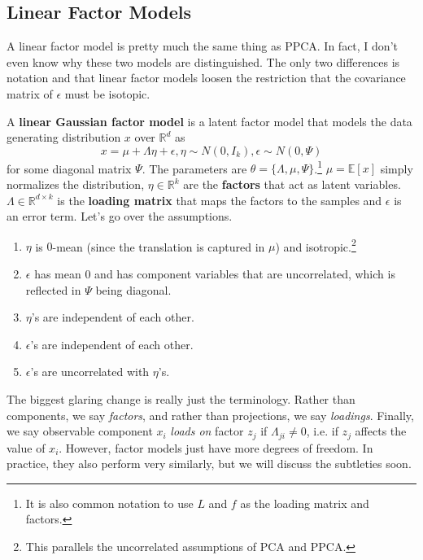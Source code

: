 \subsection{Linear Factor Models} 

  A linear factor model is pretty much the same thing as PPCA. In fact, I don't even know why these two models are distinguished. The only two differences is notation and that linear factor models loosen the restriction that the covariance matrix of $\epsilon$ must be isotopic. 

  \begin{definition} 
    A \textbf{linear Gaussian factor model} is a latent factor model that models the data generating distribution $x$ over $\mathbb{R}^d$ as 
    \begin{equation}
      x = \mu + \Lambda \eta + \epsilon, \eta \sim N(0, I_k), \epsilon \sim N(0, \Psi)
    \end{equation}
    for some diagonal matrix $\Psi$. The parameters are $\theta = \{\Lambda, \mu, \Psi\}$.\footnote{It is also common notation to use $L$ and $f$ as the loading matrix and factors.} $\mu = \mathbb{E}[x]$ simply normalizes the distribution, $\eta \in \mathbb{R}^k$ are the \textbf{factors} that act as latent variables. $\Lambda \in \mathbb{R}^{d \times k}$ is the \textbf{loading matrix} that maps the factors to the samples and $\epsilon$ is an error term. 
    Let's go over the assumptions. 
    \begin{enumerate}
      \item  $\eta$ is $0$-mean (since the translation is captured in $\mu$) and isotropic.\footnote{This parallels the uncorrelated assumptions of PCA and PPCA.}
      \item $\epsilon$ has mean $0$ and has component variables that are uncorrelated, which is reflected in $\Psi$ being diagonal.
      \item $\eta$'s are independent of each other. 
      \item $\epsilon$'s are independent of each other. 
      \item $\epsilon$'s are uncorrelated with $\eta$'s. 
    \end{enumerate}
  \end{definition} 

  The biggest glaring change is really just the terminology. Rather than components, we say \textit{factors}, and rather than projections, we say \textit{loadings}. Finally, we say observable component $x_i$ \textit{loads on} factor $z_j$ if $\Lambda_{ji} \neq 0$, i.e. if $z_j$ affects the value of $x_i$. However, factor models just have more degrees of freedom. In practice, they also perform very similarly, but we will discuss the subtleties soon. 

